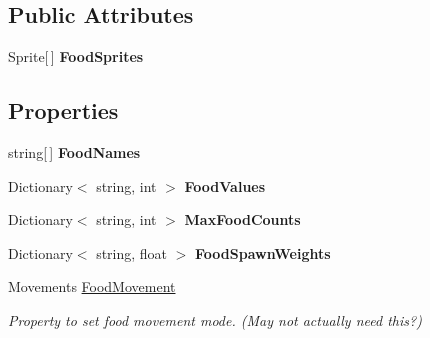 \subsection*{Public Attributes}
\begin{DoxyCompactItemize}
\item 
Sprite\mbox{[}$\,$\mbox{]} {\bfseries Food\+Sprites}\hypertarget{class_food_controller_a057095438030110578a6670576c6fa43}{}\label{class_food_controller_a057095438030110578a6670576c6fa43}

\end{DoxyCompactItemize}
\subsection*{Properties}
\begin{DoxyCompactItemize}
\item 
string\mbox{[}$\,$\mbox{]} {\bfseries Food\+Names}\hypertarget{class_food_controller_a5780c78529b71e8dc914cff2963569b5}{}\label{class_food_controller_a5780c78529b71e8dc914cff2963569b5}

\item 
Dictionary$<$ string, int $>$ {\bfseries Food\+Values}\hypertarget{class_food_controller_a4440f445f989fec97ae4ceee2ffbd841}{}\label{class_food_controller_a4440f445f989fec97ae4ceee2ffbd841}

\item 
Dictionary$<$ string, int $>$ {\bfseries Max\+Food\+Counts}\hypertarget{class_food_controller_ab1af49799b84e19e2be274d9c5b149a4}{}\label{class_food_controller_ab1af49799b84e19e2be274d9c5b149a4}

\item 
Dictionary$<$ string, float $>$ {\bfseries Food\+Spawn\+Weights}\hypertarget{class_food_controller_a41c8e47c4b31ac4de5f31599aeed0e36}{}\label{class_food_controller_a41c8e47c4b31ac4de5f31599aeed0e36}

\item 
Movements \hyperlink{class_food_controller_a345844b04406827705d89526d92a246d}{Food\+Movement}
\begin{DoxyCompactList}\small\item\em Property to set food movement mode. (May not actually need this?) \end{DoxyCompactList}\end{DoxyCompactItemize}



